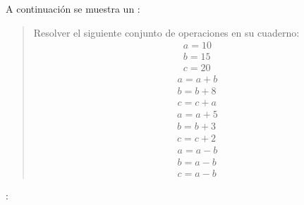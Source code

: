 \documentclass[letterpaper,10pt,spanish]{sphinxmanual}
\begin{document}
\sphinxAtStartPar
A continuación se muestra un :
\begin{quote}

\sphinxAtStartPar
Resolver el siguiente conjunto de operaciones en su cuaderno:
\begin{equation*}
\begin{split} a = 10 \\ b = 15 \\ c = 20 \end{split}
\end{equation*}\begin{equation*}
\begin{split} a = a + b \\ b = b + 8  \\ c = c + a \end{split}
\end{equation*}\begin{equation*}
\begin{split} a = a + 5 \\ b = b + 3 \\ c = c + 2 \end{split}
\end{equation*}\begin{equation*}
\begin{split} a = a - b \\ b = a - b \\ c = a - b \end{split}
\end{equation*}\end{quote}

\sphinxAtStartPar
{}:
\end{document}
